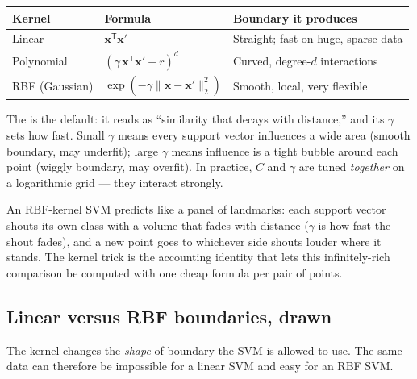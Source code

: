 \begin{mltable}
\begin{tabular}{@{}lll@{}}
\toprule
\rowcolor{MLPaleBlue!92}
Kernel & Formula & Boundary it produces \\
\midrule
Linear & $\bm{x}^{\mathsf T}\bm{x}'$ & Straight; fast on huge, sparse data \\
Polynomial & ${(\gamma\,\bm{x}^{\mathsf T}\bm{x}'+r)}^d$ & Curved, degree-$d$ interactions \\
RBF (Gaussian) & $\exp\!\left(-\gamma\|\bm{x}-\bm{x}'\|_2^2\right)$ & Smooth, local, very flexible \\
\bottomrule
\end{tabular}
\end{mltable}

The  is the default: it reads as ``similarity that decays with distance,'' and its $\gamma$ sets how fast. Small $\gamma$ means every support vector influences a wide area (smooth boundary, may underfit); large $\gamma$ means influence is a tight bubble around each point (wiggly boundary, may overfit). In practice, $C$ and $\gamma$ are tuned \emph{together} on a logarithmic grid --- they interact strongly.

\begin{intuition}
An RBF-kernel SVM predicts like a panel of landmarks: each support vector shouts its own class with a volume that fades with distance ($\gamma$ is how fast the shout fades), and a new point goes to whichever side shouts louder where it stands. The kernel trick is the accounting identity that lets this infinitely-rich comparison be computed with one cheap formula per pair of points.
\end{intuition}

\subsection{Linear versus RBF boundaries, drawn}

The kernel changes the \emph{shape} of boundary the SVM is allowed to use. The same data can therefore be impossible for a linear SVM and easy for an RBF SVM.

